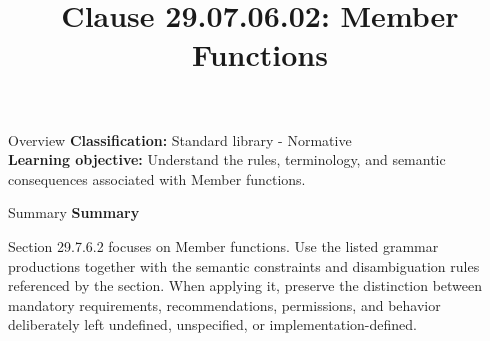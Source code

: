 \documentclass[10pt,letterpaper]{article}
\title{Clause 29.07.06.02: Member Functions}
\author{}
\date{}
\begin{document}
\maketitle
\begin{CornellOverviewBox}{Overview}
\textbf{Classification:} Standard library - Normative\\[2pt]
\textbf{Learning objective:} Understand the rules, terminology, and semantic consequences associated with Member functions.
\end{CornellOverviewBox}\begin{CornellSummaryBox}{Summary}
{\sffamily\bfseries\color{Accent} Summary}\par\vspace{3pt}Section 29.7.6.2 focuses on Member functions. Use the listed grammar productions together with the semantic constraints and disambiguation rules referenced by the section. When applying it, preserve the distinction between mandatory requirements, recommendations, permissions, and behavior deliberately left undefined, unspecified, or implementation-defined.
\end{CornellSummaryBox}
\end{document}
